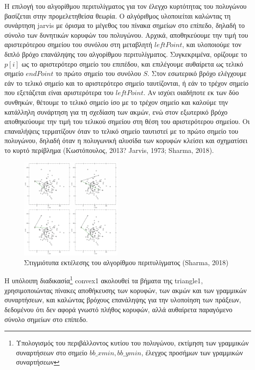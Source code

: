 Η επιλογή του αλγορίθμου περιτυλίγματος για τον έλεγχο κυρτότητας του πολυγώνου βασίζεται στην προμελετηθείσα θεωρία. Ο αλγόριθμος υλοποιείται καλώντας τη συνάρτηση \textlatin{jarvis} με όρισμα το μέγεθος του πίνακα σημείων στο επίπεδο, δηλαδή το σύνολο των δυνητικών κορυφών του πολυγώνου. Αρχικά, αποθηκεύουμε την τιμή του αριστερότερου σημείου του συνόλου στη μεταβλητή $leftPoint$, και υλοποιούμε τον διπλό βρόχο επανάληψης του αλγορίθμου περιτυλίγματος. Συγκεκριμένα, ορίζουμε το $p[i]$ ως το αριστερότερο σημείο του επιπέδου, και επιλέγουμε αυθαίρετα ως τελικό σημείο $endPoint$ το πρώτο σημείο του συνόλου $S$. Στον εσωτερικό βρόχο ελέγχουμε εάν το τελικό σημείο και το αριστερότερο σημείο ταυτίζονται, ή εάν το τρέχον σημείο που εξετάζεται είναι αριστερότερα του $leftPoint$. Αν ισχύει οιαδήποτε εκ των δύο συνθηκών, θέτουμε το τελικό σημείο ίσο με το τρέχον σημείο και καλούμε την κατάλληλη συνάρτηση για τη σχεδίαση των ακμών, ενώ στον εξωτερικό βρόχο αποθηκεύουμε την τιμή του τελικού σημείου στη θέση του αριστερότερου σημείου. Οι επαναλήψεις τερματίζουν όταν το τελικό σημείο ταυτιστεί με το πρώτο σημείο του πολυγώνου, δηλαδή όταν η πολυγωνική αλυσίδα των κορυφών κλείσει και σχηματίσει το κυρτό περίβλημα (Κωστόπουλος, 2013? \textlatin{Jarvis, 1973; Sharma, 2018}). \par

\begin{figure}[h]
\centering
\includegraphics[width=0.45\textwidth]{images/jarvis}
\caption{Στιγμιότυπα εκτέλεσης του αλγορίθμου περιτυλίγματος (\textlatin{Sharma}, 2018)}
\end{figure}

Η υπόλοιπη διαδικασία\footnote{Υπολογισμός του περιβάλλοντος κυτίου του πολυγώνου, εκτίμηση των γραμμικών συναρτήσεων στο σημείο $bb\_xmin, bb\_ymin$, έλεγχος προσήμων των γραμμικών συναρτήσεων} \textlatin{convex1} ακολουθεί τα βήματα της \textlatin{triangle1}, χρησιμοποιώντας πίνακες αποθήκευσης των κορυφών, των ακμών και των γραμμικών συναρτήσεων, και καλώντας βρόχους επανάληψης για την υλοποίηση των πράξεων, δεδομένου ότι δεν αφορά γνωστό πλήθος κορυφών, αλλά αυθαίρετα παραγόμενο σύνολο σημείων στο επίπεδο. \par

